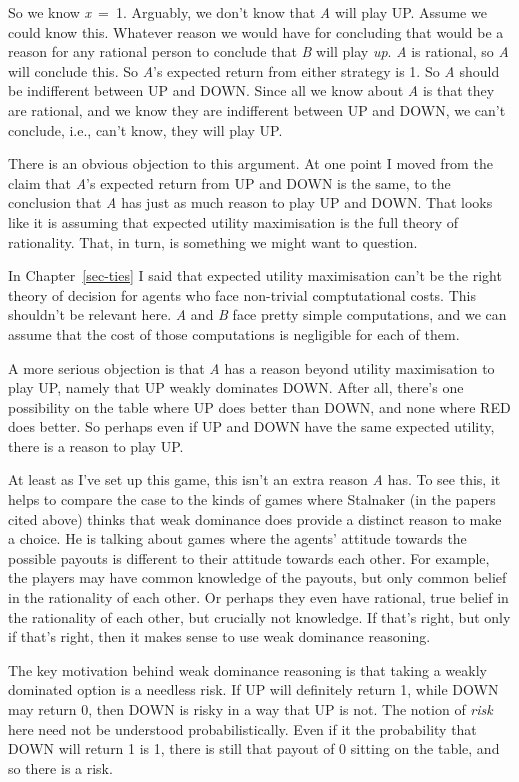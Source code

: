 \documentclass[
  10pt,
  letterpaper,
  twoside]{scrbook}
\begin{document}
So we know \emph{x}~=~1. Arguably, we don't know that \emph{A} will play
UP. Assume we could know this. Whatever reason we would have for
concluding that would be a reason for any rational person to conclude
that \emph{B} will play \emph{up}. \emph{A} is rational, so \emph{A}
will conclude this. So \emph{A}'s expected return from either strategy
is 1. So \emph{A} should be indifferent between UP and DOWN. Since all
we know about \emph{A} is that they are rational, and we know they are
indifferent between UP and DOWN, we can't conclude, i.e., can't know,
they will play UP.

There is an obvious objection to this argument. At one point I moved
from the claim that \emph{A}'s expected return from UP and DOWN is the
same, to the conclusion that \emph{A} has just as much reason to play UP
and DOWN. That looks like it is assuming that expected utility
maximisation is the full theory of rationality. That, in turn, is
something we might want to question.

In Chapter~\ref{sec-ties} I said that expected utility maximisation
can't be the right theory of decision for agents who face non-trivial
comptutational costs. This shouldn't be relevant here. \emph{A} and
\emph{B} face pretty simple computations, and we can assume that the
cost of those computations is negligible for each of them.

A more serious objection is that \emph{A} has a reason beyond utility
maximisation to play UP, namely that UP weakly dominates DOWN. After
all, there's one possibility on the table where UP does better than
DOWN, and none where RED does better. So perhaps even if UP and DOWN
have the same expected utility, there is a reason to play UP.

At least as I've set up this game, this isn't an extra reason \emph{A}
has. To see this, it helps to compare the case to the kinds of games
where Stalnaker (in the papers cited above) thinks that weak dominance
does provide a distinct reason to make a choice. He is talking about
games where the agents' attitude towards the possible payouts is
different to their attitude towards each other. For example, the players
may have common knowledge of the payouts, but only common belief in the
rationality of each other. Or perhaps they even have rational, true
belief in the rationality of each other, but crucially not knowledge. If
that's right, but only if that's right, then it makes sense to use weak
dominance reasoning.

The key motivation behind weak dominance reasoning is that taking a
weakly dominated option is a needless risk. If UP will definitely return
1, while DOWN may return 0, then DOWN is risky in a way that UP is not.
The notion of \emph{risk} here need not be understood probabilistically.
Even if it the probability that DOWN will return 1 is 1, there is still
that payout of 0 sitting on the table, and so there is a risk.
\end{document}
